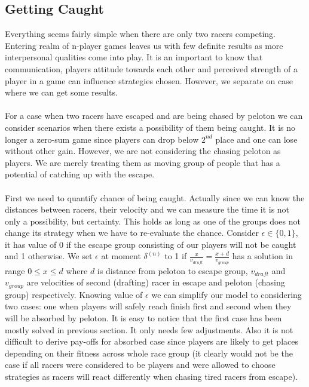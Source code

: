 \documentclass[10pt, a4paper]{report}
\begin{document}
\subsection{Getting Caught}\label{subsec:getcaught}
Everything seems fairly simple when there are only two racers competing. Entering realm of n-player games leaves us with few definite results as more interpersonal qualities come into play. It is an important to know that communication, players attitude towards each other and perceived strength of a player in a game can influence strategies chosen. However, we separate on case where we can get some results.
\\\\
For a case when two racers have escaped and are being chased by peloton we can consider scenarios when there exists a possibility of them being caught. It is no longer a zero-sum game since players can drop below $2^{nd}$ place and one can lose without other gain. However, we are not considering the chasing peloton as players. We are merely treating them as moving group of people that has a potential of catching up with the escape.
\\\\
First we need to quantify chance of being caught. Actually since we can know the distances between racers, their velocity and we can measure the time it is not only a possibility, but certainty. This holds as long as one of the groups does not change its strategy when we have to re-evaluate the chance. Consider $\epsilon \in \{0,1\}$, it has value of 0 if the escape group consisting of our players will not be caught and 1 otherwise. We set $\epsilon$ at moment $\delta^{(n)}$ to 1 if $\frac{x}{v_{draft}}=\frac{x+d}{v_{group}}$ has a solution in range $0\le x\le d$ where $d$ is distance from peloton to escape group, $v_{draft}$ and $v_{group}$ are velocities of second (drafting) racer in escape and peloton (chasing group) respectively. Knowing value of $\epsilon$ we can simplify our model to considering two cases: one when players will safely reach finish first and second when they will be absorbed by peloton. It is easy to notice that the first case has been mostly solved in previous section. It only needs few adjustments. Also it is not difficult to derive pay-offs for absorbed case since players are likely to get places depending on their fitness across whole race group (it clearly would not be the case if all racers were considered to be players and were allowed to choose strategies as racers will react differently when chasing tired racers from escape).
\end{document}
